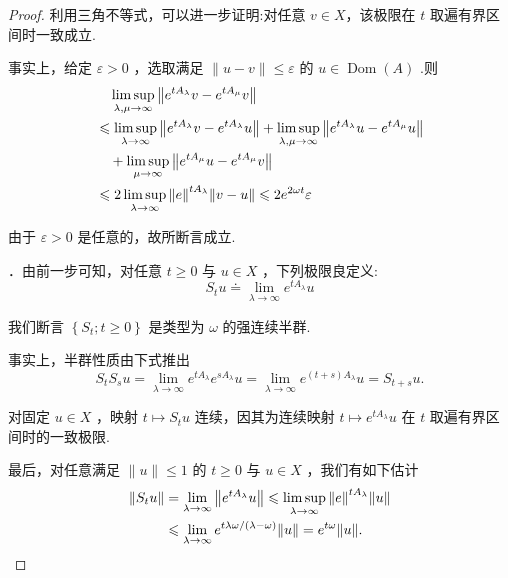 \begin{proof}
\vspace{-0.5 em}
利用三角不等式，可以进一步证明:对任意 $v \in  X$，该极限在 $t$ 取遍有界区间时一致成立.

事实上，给定 $\varepsilon  > 0$ ，选取满足 $\| u - v\|  \leq  \varepsilon$ 的 $u \in  \operatorname{Dom}\left( A\right)$ .则
{\setjot[-2]\begin{align*}
    &\quad\limsup_{{\lambda ,\mu  \rightarrow  \infty }}\norm{{e}^{t{A}_{\lambda }}v - {e}^{t{A}_{\mu }}v}\\
    &\leqslant  \limsup_{{\lambda  \rightarrow  \infty }}\norm{{e}^{t{A}_{\lambda }}v - {e}^{t{A}_{\lambda }}u} + \limsup_{{\lambda ,\mu  \rightarrow  \infty }}\norm{{e}^{t{A}_{\lambda }}u - {e}^{t{A}_{\mu }}u}\\ 
    &\quad+\limsup_{{\mu  \rightarrow  \infty }}\norm{{e}^{t{A}_{\mu }}u - {e}^{t{A}_{\mu }}v}\\
    &\leqslant  2\limsup_{{\lambda  \rightarrow  \infty }}\norm{e}^{t{A}_{\lambda }}\norm{v - u} \leqslant  2{e}^{2\omega t}\varepsilon
\end{align*}}

由于 $\varepsilon  > 0$ 是任意的，故所断言成立.

．由前一步可知，对任意 $t \geq  0$ 与 $u \in  X$ ，下列极限良定义:
\[
{S}_{t}u \doteq  \mathop{\lim }\limits_{{\lambda  \rightarrow  \infty }}{e}^{t{A}_{\lambda }}u
\]

我们断言 $\left\{  {{S}_{t};t \geq  0}\right\}$ 是类型为 $\omega$ 的强连续半群.

事实上，半群性质由下式推出
\[
{S}_{t}{S}_{s}u = \mathop{\lim }\limits_{{\lambda  \rightarrow  \infty }}{e}^{t{A}_{\lambda }}{e}^{s{A}_{\lambda }}u = \mathop{\lim }\limits_{{\lambda  \rightarrow  \infty }}{e}^{\left( {t + s}\right) {A}_{\lambda }}u = {S}_{t + s}u.
\]

对固定 $u \in  X$ ，映射 $t \mapsto  {S}_{t}u$ 连续，因其为连续映射 $t \mapsto  {e}^{t{A}_{\lambda }}u$ 在 $t$ 取遍有界区间时的一致极限.

最后，对任意满足 $\| u\|  \leq  1$ 的 $t \geq  0$ 与 $u \in  X$ ，我们有如下估计
{\setjot[-2]\begin{align*}
\norm{{S}_{t}u} &= \mathop{\lim }\limits_{{\lambda  \rightarrow  \infty }}\norm{{e}^{t{A}_{\lambda }}u} \leqslant  \limsup_{{\lambda  \rightarrow  \infty }}\norm{e}^{t{A}_{\lambda }}\| u\|\\
&\leqslant  \mathop{\lim }\limits_{{\lambda  \rightarrow  \infty }}{e}^{{t\lambda \omega }/\left( {\lambda  - \omega }\right) }\| u\|  = {e}^{t\omega }\| u\| .
\end{align*}}


\end{proof}
